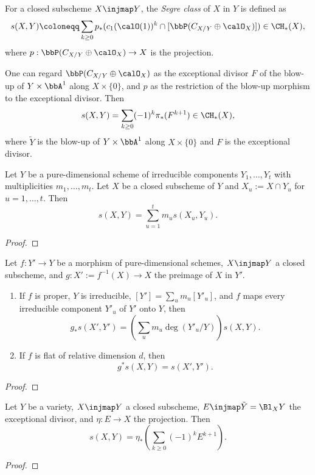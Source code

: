   \begin{definition}
    For a closed subscheme $X \injmap Y$, the \emph{Segre class} of $X$ in $Y$ is defined as
    \[ s(X,Y) \coloneqq \sum_{k\geq 0} p_*(c_1(\calO(1))^k \cap [\bbP(C_{X/Y} \oplus \calO_X)]) \in \CH_*(X), \]
    where $p: \bbP(C_{X/Y} \oplus \calO_X) \to X$ is the projection.
  \end{definition}

  One can regard $\bbP(C_{X/Y} \oplus \calO_X)$ as the exceptional divisor $F$ of the blow-up of $Y \times \bbA^1$ along $X \times \{0\}$, 
  and $p$ as the restriction of the blow-up morphism to the exceptional divisor.
  Then 
  \[ s(X,Y) = \sum_{k\geq 0} (-1)^k \pi_*(F^{k+1}) \in \CH_*(X), \]
  where $\tilde{Y}$ is the blow-up of $Y \times \bbA^1$ along $X \times \{0\}$ and $F$ is the exceptional divisor.
  
  \begin{lemma}
    Let $Y$ be a pure-dimensional scheme of irreducible components $Y_1, \dots, Y_t$ with multiplicities $m_1, \dots, m_t$.
    Let $X$ be a closed subscheme of $Y$ and $X_u := X \cap Y_u$ for $u=1, \dots, t$.
    Then
    \[ s(X,Y) = \sum_{u=1}^t m_u s(X_u, Y_u). \]
  \end{lemma}
  \begin{proof}
    \Yang{}
  \end{proof}

  \begin{proposition}
    Let $f: Y' \to Y$ be a morphism of pure-dimensional schemes, $X \injmap Y$ a closed subscheme, and $g: X' := f^{-1}(X) \to X$ the preimage of $X$ in $Y'$.
    \begin{enumerate}
      \item If $f$ is proper, $Y$ is irreducible, $[Y'] = \sum_u m_u [Y'_u]$, and $f$ maps every irreducible component $Y'_u$ of $Y'$ onto $Y$, then
        \[ g_* s(X', Y') = \left(\sum_u m_u \deg(Y'_u/Y)\right) s(X,Y). \]
      \item If $f$ is flat of relative dimension $d$, then
        \[ g^* s(X,Y) = s(X', Y'). \]
    \end{enumerate}
  \end{proposition}
  \begin{proof}
    \Yang{}
  \end{proof}

  \begin{corollary}
    Let $Y$ be a variety, $X \injmap Y$ a closed subscheme, $E \injmap \tilde{Y} = \Bl_X Y$ the exceptional divisor, and $\eta: E \to X$ the projection.
    Then 
    \[ s(X,Y) = \eta_* \left( \sum_{k\geq 0} (-1)^k E^{k+1} \right). \]
  \end{corollary}
  \begin{proof}
    \Yang{}
  \end{proof}

